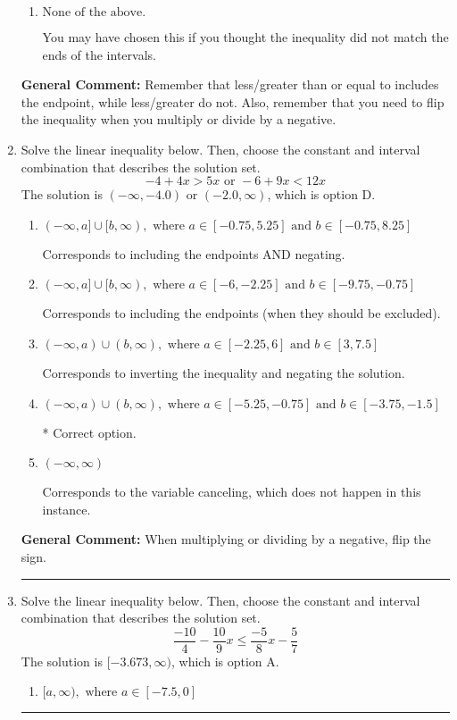 \documentclass{extbook}[14pt]
\newcommand{\litem}[1]{\item #1

\rule{\textwidth}{0.4pt}}
\begin{document}
\begin{enumerate}
{\begin{enumerate}[label=\Alph*.]
 $(-\infty, 22.2]$, which corresponds to switching the direction of the interval. You likely did this if you did not flip the inequality when dividing by a negative!
\item \( \text{None of the above}. \)

You may have chosen this if you thought the inequality did not match the ends of the intervals.
\end{enumerate}

\textbf{General Comment:} Remember that less/greater than or equal to includes the endpoint, while less/greater do not. Also, remember that you need to flip the inequality when you multiply or divide by a negative.
}
\litem{
Solve the linear inequality below. Then, choose the constant and interval combination that describes the solution set.
\[ -4 + 4 x > 5 x \text{ or } -6 + 9 x < 12 x \]The solution is \( (-\infty, -4.0) \text{ or } (-2.0, \infty) \), which is option D.\begin{enumerate}[label=\Alph*.]
\item \( (-\infty, a] \cup [b, \infty), \text{ where } a \in [-0.75, 5.25] \text{ and } b \in [-0.75, 8.25] \)

Corresponds to including the endpoints AND negating.
\item \( (-\infty, a] \cup [b, \infty), \text{ where } a \in [-6, -2.25] \text{ and } b \in [-9.75, -0.75] \)

Corresponds to including the endpoints (when they should be excluded).
\item \( (-\infty, a) \cup (b, \infty), \text{ where } a \in [-2.25, 6] \text{ and } b \in [3, 7.5] \)

Corresponds to inverting the inequality and negating the solution.
\item \( (-\infty, a) \cup (b, \infty), \text{ where } a \in [-5.25, -0.75] \text{ and } b \in [-3.75, -1.5] \)

 * Correct option.
\item \( (-\infty, \infty) \)

Corresponds to the variable canceling, which does not happen in this instance.
\end{enumerate}

\textbf{General Comment:} When multiplying or dividing by a negative, flip the sign.
}
\litem{
Solve the linear inequality below. Then, choose the constant and interval combination that describes the solution set.
\[ \frac{-10}{4} - \frac{10}{9} x \leq \frac{-5}{8} x - \frac{5}{7} \]The solution is \( [-3.673, \infty) \), which is option A.\begin{enumerate}[label=\Alph*.]
\item \( [a, \infty), \text{ where } a \in [-7.5, 0] \)


\end{enumerate}}
\end{enumerate}
\end{document}
